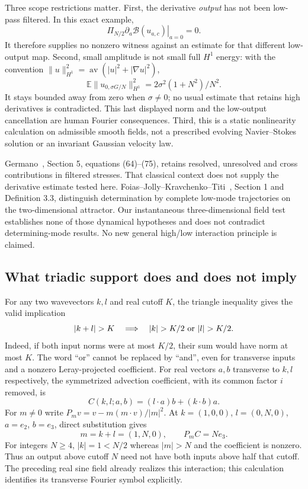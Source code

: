\documentclass[11pt]{article}
\newcommand{\E}{\mathbb E}
\begin{document}
Three scope restrictions matter. First, the derivative \emph{output}
has not been low-pass filtered. In this exact example,
\[
 \Pi_{N/2}\left.\partial_a\mathcal B(u_{a,c})\right|_{a=0}=0.
\]
It therefore supplies no nonzero witness against an estimate for that
different low-output map. Second, small amplitude is not small full
$H^1$ energy: with the convention
$\|u\|_{H^1}^2=\operatorname{av}(|u|^2+|\nabla u|^2)$,
\[
 \E\|u_{0,\sigma G/N}\|_{H^1}^2
 =2\sigma^2(1+N^2)/N^2.
\]
It stays bounded away from zero when $\sigma\ne0$; no usual estimate
that retains high derivatives is contradicted. This last displayed
norm and the low-output cancellation are human Fourier consequences.
Third, this is a static nonlinearity calculation on admissible smooth
fields, not a prescribed evolving Navier--Stokes solution or an invariant
Gaussian velocity law.

Germano~\cite{Germano}, Section 5, equations (64)--(75), retains
resolved, unresolved and cross contributions in filtered stresses.
That classical context does not supply the derivative estimate tested
here. Foias--Jolly--Kravchenko--Titi~\cite{FJKT}, Section 1 and
Definition 3.3, distinguish determination by complete low-mode
trajectories on the two-dimensional attractor. Our instantaneous
three-dimensional field test establishes none of those dynamical
hypotheses and does not contradict determining-mode results.
No new general high/low interaction principle is claimed.

\subsection*{What triadic support does and does not imply}
For any two wavevectors $k,l$ and real cutoff $K$, the triangle
inequality gives the valid implication
\[
 |k+l|>K\quad\Longrightarrow\quad
 |k|>K/2\ \hbox{or}\ |l|>K/2.
\]
Indeed, if both input norms were at most $K/2$, their sum would have
norm at most $K$. The word ``or'' cannot be replaced by ``and'',
even for transverse inputs and a nonzero Leray-projected coefficient.
For real vectors $a,b$ transverse to $k,l$ respectively, the
symmetrized advection coefficient, with its common factor $i$ removed,
is
\[
 C(k,l;a,b)=(l\cdot a)b+(k\cdot b)a.
\]
For $m\ne0$ write $P_m v=v-m(m\cdot v)/|m|^2$.
At $k=(1,0,0)$, $l=(0,N,0)$, $a=e_2$, $b=e_3$, direct substitution
gives
\[
 m=k+l=(1,N,0),\qquad P_m C=N e_3.
\]
For integers $N\geq4$, $|k|=1<N/2$ whereas $|m|>N$ and the
coefficient is nonzero. Thus an output above cutoff $N$ need not have
both inputs above half that cutoff. The preceding real sine field
already realizes this interaction; this calculation identifies its
transverse Fourier symbol explicitly.
\end{document}
